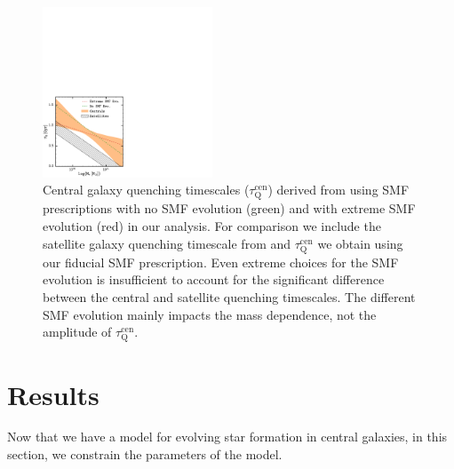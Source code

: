 \documentclass[iop,apj,tighten,twocolappendix,numberedappendix]{emulateapj}
\newcommand{\taucen}{\tau_\mathrm{Q}^\mathrm{cen}}
\begin{document}
\begin{figure}
\begin{center}
\includegraphics[width=0.45\textwidth]{figs/tau_SMFevolcomparison.pdf}
\caption{Central galaxy quenching timescales ($\taucen$) derived from using 
SMF prescriptions with no SMF evolution (green) and with extreme SMF evolution 
(red) in our analysis. For comparison we include the satellite galaxy quenching 
timescale from \cite{Wetzel:2013aa} and $\taucen$ we obtain using our fiducial 
SMF prescription. Even extreme choices for the SMF evolution is insufficient to 
account for the significant difference between the central and satellite 
quenching timescales. The different SMF evolution mainly impacts the mass 
dependence, not the amplitude of $\taucen$.}
\label{fig:tau_smfevol}
\end{center}
\end{figure}

\section{Results} \label{sec:resultss}
Now that we have a model for evolving star formation in central 
galaxies, in this section, we constrain the parameters of the 
model.
\end{document}
